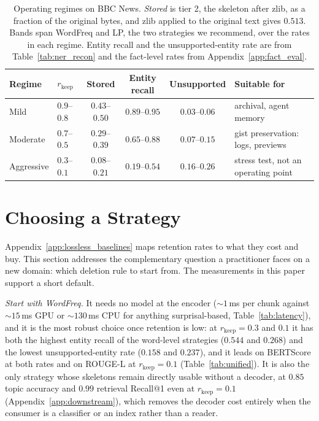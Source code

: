\documentclass[11pt]{article}
\newcommand{\rkeep}{r_{\mathrm{keep}}}
\begin{document}
\begin{table}[tbp]
\centering
\small
\setlength{\tabcolsep}{5pt}
\caption{Operating regimes on BBC News. \emph{Stored} is tier 2, the skeleton after zlib, as a fraction of the original bytes, and zlib applied to the original text gives $0.513$. Bands span WordFreq and LP, the two
strategies we recommend, over the rates in each regime. Entity recall and the unsupported-entity rate are
from Table~\ref{tab:ner_recon} and the fact-level rates from Appendix~\ref{app:fact_eval}.}
\label{tab:regimes}
\begin{tabular}{llcccl}
\toprule
Regime & $\rkeep$ & Stored & Entity recall & Unsupported & Suitable for \\
\midrule
Mild       & $0.9$--$0.8$ & $0.43$--$0.50$ & $0.89$--$0.95$ & $0.03$--$0.06$ & archival, agent memory \\
Moderate   & $0.7$--$0.5$ & $0.29$--$0.39$ & $0.65$--$0.88$ & $0.07$--$0.15$ & gist preservation: logs, previews \\
Aggressive & $0.3$--$0.1$ & $0.08$--$0.21$ & $0.19$--$0.54$ & $0.16$--$0.26$ & stress test, not an operating point \\
\bottomrule
\end{tabular}
\end{table}

\section{Choosing a Strategy}
\label{app:choosing}

Appendix~\ref{app:lossless_baselines} maps retention rates to what they cost and buy.
This section addresses the complementary question a practitioner faces on a new domain: which deletion
rule to start from. The measurements in this paper support a short default.

\emph{Start with WordFreq.} It needs no model at the encoder (${\sim}1$\,ms per chunk against
${\sim}15$\,ms GPU or ${\sim}130$\,ms CPU for anything surprisal-based, Table~\ref{tab:latency}), and it is
the most robust choice once retention is low: at $\rkeep = 0.3$ and $0.1$ it has both the highest entity
recall of the word-level strategies ($0.544$ and $0.268$) and the lowest unsupported-entity rate ($0.158$
and $0.237$), and it leads on BERTScore at both rates and on ROUGE-L at $\rkeep = 0.1$ (Table~\ref{tab:unified}). It is also the
only strategy whose skeletons remain directly usable without a decoder, at $0.85$ topic accuracy and $0.99$
retrieval Recall@1 even at $\rkeep = 0.1$ (Appendix~\ref{app:downstream}), which removes the decoder cost
entirely when the consumer is a classifier or an index rather than a reader.
\end{document}
